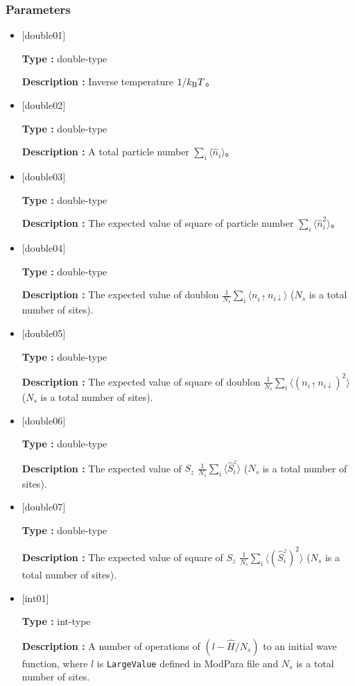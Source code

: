 \subsubsection{Parameters}
 \begin{itemize}

  \item  $[$double01$]$
  
 {\bf Type :} double-type

{\bf Description :} Inverse temperature $1/{k_{\rm B}T}$。
 
  \item $[$double02$]$

 {\bf Type :} double-type 

{\bf Description :}  A total particle number $\sum_{i} \langle \hat{n}_i \rangle$。

  \item $[$double03$]$

 {\bf Type :} double-type 

{\bf Description :} The expected value of square of particle number $\sum_{i} \langle \hat{n}_i^2 \rangle$。

  \item $[$double04$]$

 {\bf Type :} double-type 

{\bf Description :} The expected value of doublon $\frac{1}{N_s} \sum_{i}\langle n_{i\uparrow}n_{i\downarrow}\rangle$ ($N_s$ is a total number of sites).

  \item $[$double05$]$

 {\bf Type :} double-type 

{\bf Description :} The expected value of square of doublon 
$\frac{1}{N_s} \sum_{i}\langle (n_{i\uparrow} n_{i\downarrow})^2\rangle$ ($N_s$ is a total number of sites).

  \item $[$double06$]$

 {\bf Type :} double-type 

{\bf Description :} The expected value of $S_z$
$\frac{1}{N_s} \sum_{i}\langle \hat{S}_i^z\rangle$ ($N_s$ is a total number of sites).

  \item $[$double07$]$

 {\bf Type :} double-type 

{\bf Description :}  The expected value of square of $S_z$
$\frac{1}{N_s} \sum_{i}\langle (\hat{S}_i^z)^2\rangle$ ($N_s$ is a total number of sites).

 \item $[$int01$]$

 {\bf Type :} int-type 

{\bf Description :} A number of operations of $(l-\hat{H}/N_{s})$ to an initial wave function, where $l$ is \verb|LargeValue| defined in ModPara file and $N_{s}$ is a total number of sites.

 \end{itemize}


